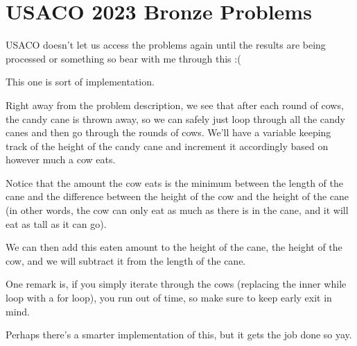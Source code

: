 \documentclass[12pt]{article}
\begin{document}
\section*{USACO 2023 Bronze Problems}

USACO doesn't let us access the problems again until the results are being processed or something so bear with me through this :(

\begin{problemnum}
    This one is sort of implementation.

    Right away from the problem description, we see that after each round of
    cows, the candy cane is thrown away, so we can safely just loop through all
    the candy canes and then go through the rounds of cows. We'll have a
    variable keeping track of the height of the candy cane and increment it accordingly based on however much a cow eats.

    Notice that the amount the cow eats is the minimum between the length of
    the cane and the difference between the height of the cow and the height of
    the cane (in other words, the cow can only eat as much as there is in the
    cane, and it will eat as tall as it can go).

    We can then add this eaten amount to the height of the cane, the height of
    the cow, and we will subtract it from the length of the cane.

    One remark is, if you simply iterate through the cows (replacing the inner
    while loop with a for loop), you run out of time, so make sure to keep
    early exit in mind.

    

    Perhaps there's a smarter implementation of this, but it gets the job done so yay.
\end{problemnum}
\end{document}
